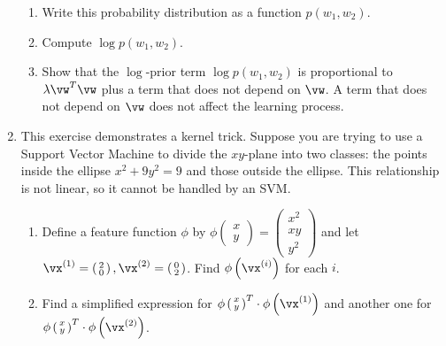 \documentclass{article}
\begin{document}
\begin{enumerate}
\begin{enumerate}
    \item Write this probability distribution as a function $p(w_1,w_2)$.
    \item Compute $\log p(w_1,w_2)$.
    \item Show that the $\log$-prior term $\log p(w_1,w_2)$ is proportional to $\lambda \vw^T\vw$ plus a term that does not depend on $\vw$. A term that does not depend on $\vw$ does not affect the learning process.
\end{enumerate}

\item \label{ML_ex_kerneltrick} 
This exercise demonstrates a kernel trick. Suppose you are trying to use a Support Vector Machine to divide the $xy$-plane into two classes: the points inside the ellipse $x^2 + 9y^2 = 9$ and those outside the ellipse. This relationship is not linear, so it cannot be handled by an SVM.
\begin{enumerate} 
    \item Define a feature function $\phi$ by   
                    $\phi\left( \begin{smallmatrix} x \\ y           \end{smallmatrix} \right) 
                       = \left( \begin{smallmatrix} x^2 \\ xy \\ y^2 \end{smallmatrix} \right)$ 
    and let $\vx^{(1)} = \left( \begin{smallmatrix} 2 \\ 0           \end{smallmatrix} \right), 
             \vx^{(2)} = \left( \begin{smallmatrix} 0 \\ 2           \end{smallmatrix} \right)$. 
          Find $\phi\left(\vx^{(i)}\right)$ for each $i$.
    \item      Find a simplified expression for $\phi\left( \begin{smallmatrix} x \\ y \end{smallmatrix} \right)^T \cdot \phi\left(\vx^{(1)}\right)$ 
                           and another one for  $\phi\left( \begin{smallmatrix} x \\ y \end{smallmatrix} \right)^T \cdot \phi\left(\vx^{(2)}\right)$.

\end{enumerate}
\end{enumerate}
\end{document}
